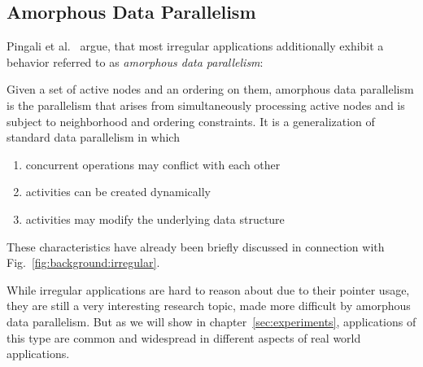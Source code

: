 \subsection{Amorphous Data Parallelism}
\label{sec:background:irregular:adp}

Pingali et al.~\cite{pingali2009amorphous} argue, that most irregular applications additionally exhibit a behavior referred to as \emph{amorphous data parallelism}:

Given a set of active nodes and an ordering on them, amorphous data parallelism is the parallelism that arises from simultaneously processing active nodes and is subject to neighborhood and ordering constraints.
It is a generalization of standard data parallelism in which
\begin{enumerate}
    \item concurrent operations may conflict with each other
    \item activities can be created dynamically
    \item activities may modify the underlying data structure
\end{enumerate}
These characteristics have already been briefly discussed in connection with Fig.~\ref{fig:background:irregular}.

While irregular applications are hard to reason about due to their pointer usage, they are still a very interesting research topic, made more difficult by amorphous data parallelism.
But as we will show in chapter~\ref{sec:experiments}, applications of this type are common and widespread in different aspects of real world applications.




